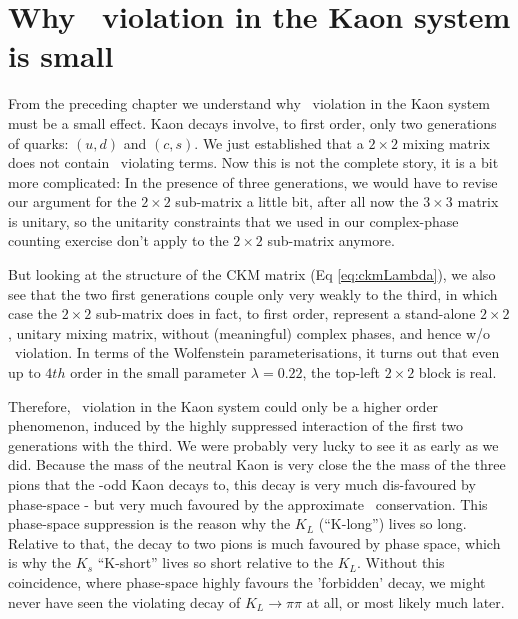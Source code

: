 \section{Why \cp\ violation in the Kaon system is small}
 \label{sec:cpv_kaon}
 From the preceding chapter we understand why \cp\ violation in the
 Kaon system must be a small effect. Kaon decays involve, to first
 order, only two generations of quarks: $(u,d)$ and $(c,s)$. We just
 established that a $2\times 2$ mixing matrix does not contain \cp\
 violating terms. Now this is not the complete story, it is a bit more
 complicated: In the presence of three generations, we would have
 to revise our argument for the $2\times 2$ sub-matrix a little bit,
 after all now the $3\times 3$ matrix is unitary, so the unitarity
 constraints that we used in our complex-phase counting exercise
 don't apply to the $2\times 2$ sub-matrix anymore.

 But looking at the structure of the CKM matrix (Eq
 \ref{eq:ckmLambda}), we also see that the two first generations
 couple only very weakly to the third, in which case the $2\times 2$
 sub-matrix does in fact, to first order, represent a stand-alone
 $2\times 2$, unitary mixing matrix, without (meaningful) complex
 phases, and hence w/o \cp\ violation. In terms of the Wolfenstein
 parameterisations, it turns out that even up to $4th$ order in the
 small parameter $\lambda=0.22$, the top-left $2\times 2$ block is
 real.

 Therefore, \cp\ violation in the Kaon system could only be a higher
 order phenomenon, induced by the highly suppressed interaction of the
 first two generations with the third. We were probably very lucky to
 see it as early as we did. Because the mass of the neutral Kaon is very close the the
 mass of the three pions that the \cp-odd Kaon decays to, this decay is
 very much dis-favoured by phase-space - but very much favoured by the
 approximate \cp\ conservation. This phase-space suppression is the reason
 why the $K_L$ (``K-long'') lives so long. Relative to that, the decay
 to two pions is much favoured by phase space, which is why the $K_s$
 ``K-short'' lives so short relative to the $K_L$. Without this
 coincidence, where phase-space highly favours the 'forbidden' decay,
 we might never have seen the \cp\-violating decay of $K_L\to \pi\pi$ at
 all, or most likely much later.
